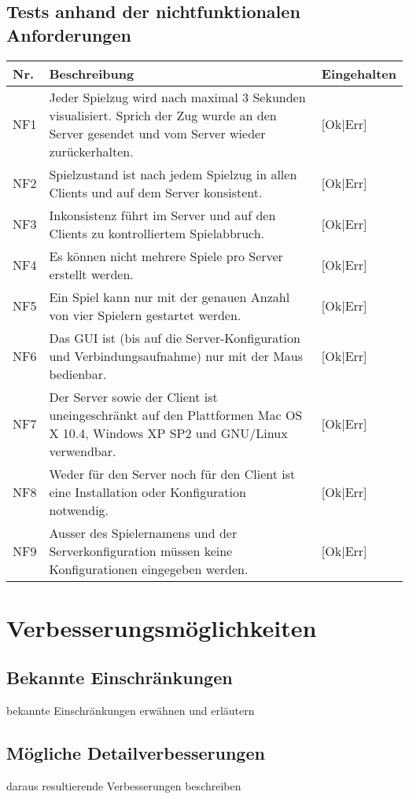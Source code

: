 \documentclass[12pt,halfparskip]{scrartcl}
\begin{document}

\subsection{Tests anhand der nichtfunktionalen Anforderungen}\label{sub:tests_anhand_der_nichtfunktionalen_anforderungen} %
\begin {tabular}{l p{11cm} l}
\toprule
\textbf{Nr.} & \textbf{Beschreibung} & \textbf{Eingehalten} \\
\midrule
NF1 & Jeder Spielzug wird nach maximal 3 Sekunden visualisiert. Sprich der Zug wurde an den Server gesendet und vom Server wieder zurückerhalten. & [Ok|Err] \\
NF2 & Spielzustand ist nach jedem Spielzug in allen Clients und auf dem Server konsistent. & [Ok|Err] \\
NF3 & Inkonsistenz führt im Server und auf den Clients zu kontrolliertem Spielabbruch. & [Ok|Err] \\
NF4 & Es können nicht mehrere Spiele pro Server erstellt werden. & [Ok|Err] \\
NF5 & Ein Spiel kann nur mit der genauen Anzahl von vier Spielern gestartet werden. & [Ok|Err] \\
NF6 & Das GUI ist (bis auf die Server-Konfiguration und Verbindungsaufnahme) nur mit der Maus bedienbar. & [Ok|Err] \\
NF7 & Der Server sowie der Client ist uneingeschränkt auf den Plattformen Mac OS X 10.4, Windows XP SP2 und GNU/Linux verwendbar. & [Ok|Err] \\
NF8 & Weder für den Server noch für den Client ist eine Installation oder Konfiguration notwendig. & [Ok|Err] \\
NF9 & Ausser des Spielernamens und der Serverkonfiguration müssen keine Konfigurationen eingegeben werden. & [Ok|Err] \\
\bottomrule
\end{tabular}



\section{Verbesserungsmöglichkeiten} %
\label{sec:verbesserungsmöglichkeiten}
\subsection{Bekannte Einschränkungen} %
\label{sub:bekannte_einschränkungen}
bekannte Einschränkungen erwähnen und erläutern
\subsection{Mögliche Detailverbesserungen} %
\label{sub:mögliche_detailverbesserungen}
daraus resultierende Verbesserungen beschreiben
\end{document}
